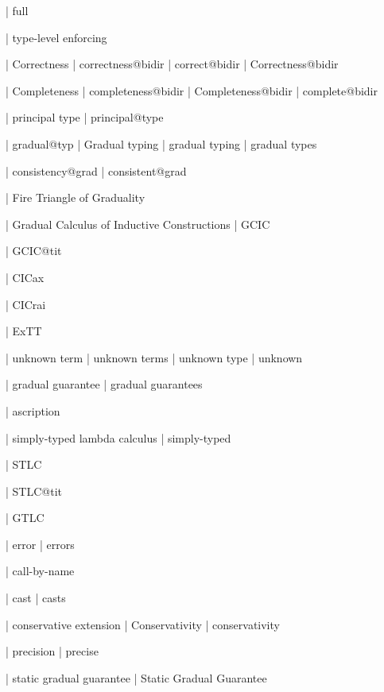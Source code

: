   | full

  | type-level enforcing

  | Correctness
  | correctness@bidir
  | correct@bidir
  | Correctness@bidir

  | Completeness
  | completeness@bidir
  | Completeness@bidir
  | complete@bidir


  | principal type
  | principal@type



  | gradual@typ
  | Gradual typing
  | gradual typing
  | gradual types

  | consistency@grad
  | consistent@grad

  | Fire Triangle of Graduality

  | Gradual Calculus of Inductive Constructions
  | GCIC

  | GCIC@tit


  | CICax

  | CICrai

  | ExTT

  | unknown term
  | unknown terms
  | unknown type
  | unknown

  | gradual guarantee
  | gradual guarantees

  | ascription

  | simply-typed lambda calculus
  | simply-typed

  | STLC

  | STLC@tit

  | GTLC

  | error
  | errors

  | call-by-name

  | cast
  | casts

  | conservative extension
  | Conservativity
  | conservativity

  | precision
  | precise

  | static gradual guarantee
  | Static Gradual Guarantee

